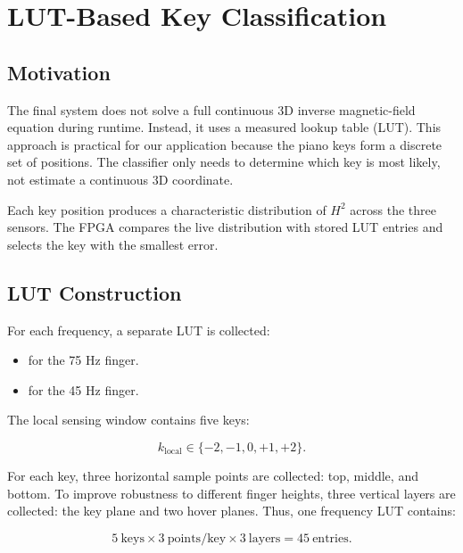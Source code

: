 \section{LUT-Based Key Classification}
\label{sec:lut_classification}

\subsection{Motivation}

The final system does not solve a full continuous 3D inverse magnetic-field equation during runtime. Instead, it uses a measured lookup table (LUT). This approach is practical for our application because the piano keys form a discrete set of positions. The classifier only needs to determine which key is most likely, not estimate a continuous 3D coordinate.

Each key position produces a characteristic distribution of $H^2$ across the three sensors. The FPGA compares the live distribution with stored LUT entries and selects the key with the smallest error.

\subsection{LUT Construction}

For each frequency, a separate LUT is collected:

\begin{itemize}
    \item {} for the 75 Hz finger.
    \item {} for the 45 Hz finger.
\end{itemize}

The local sensing window contains five keys:

\begin{equation}
    k_{\mathrm{local}} \in \{-2,-1,0,+1,+2\}.
\end{equation}

For each key, three horizontal sample points are collected: top, middle, and bottom. To improve robustness to different finger heights, three vertical layers are collected: the key plane and two hover planes. Thus, one frequency LUT contains:

\begin{equation}
    5~\mathrm{keys} \times 3~\mathrm{points/key} \times 3~\mathrm{layers}
    = 45~\mathrm{entries}.
\end{equation}

